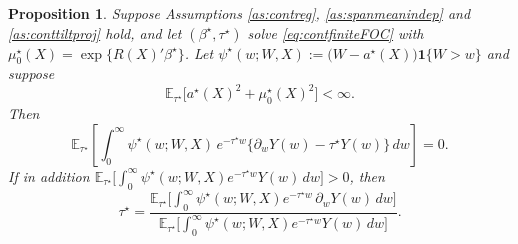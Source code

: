 \documentclass[11pt]{article}
\newtheorem{proposition}[theorem]{Proposition}
\theoremstyle{definition}
\theoremstyle{plain}
\newcommand{\E}{\mathbb{E}}
\newcommand{\1}{\mathbf{1}}
\begin{document}
\begin{proposition}
\label{prop:contexpost}
Suppose Assumptions \ref{as:contreg}, \ref{as:spanmeanindep} and \ref{as:conttiltproj} hold, and let $(\beta^\star,\tau^\star)$ solve \eqref{eq:contfiniteFOC} with $\mu_0^\star(X)=\exp\{R(X)'\beta^\star\}$.  Let $\psi^\star(w;W,X):=\bigl(W-a^\star(X)\bigr)\1\{W>w\}$ and suppose
\begin{equation}
\E_{\tau^\star}\bigl[a^\star(X)^2+\mu_0^\star(X)^2\bigr]<\infty .
\label{eq:contexpostintegrable}
\end{equation}
Then
\begin{equation}
\E_{\tau^\star}\left[\int_0^\infty \psi^\star(w;W,X)\,e^{-\tau^\star w}\bigl\{\partial_wY(w)-\tau^\star Y(w)\bigr\}\,dw\right]=0 .
\label{eq:contexpostmoment}
\end{equation}
If in addition $\E_{\tau^\star}\bigl[\int_0^\infty\psi^\star(w;W,X)e^{-\tau^\star w}Y(w)\,dw\bigr]>0$, then
\begin{equation}
\tau^\star
=
\frac{\E_{\tau^\star}\bigl[\int_0^\infty\psi^\star(w;W,X)e^{-\tau^\star w}\,\partial_wY(w)\,dw\bigr]}
     {\E_{\tau^\star}\bigl[\int_0^\infty\psi^\star(w;W,X)e^{-\tau^\star w}Y(w)\,dw\bigr]} .
\label{eq:contexpostratio}
\end{equation}
\end{proposition}
\end{document}
